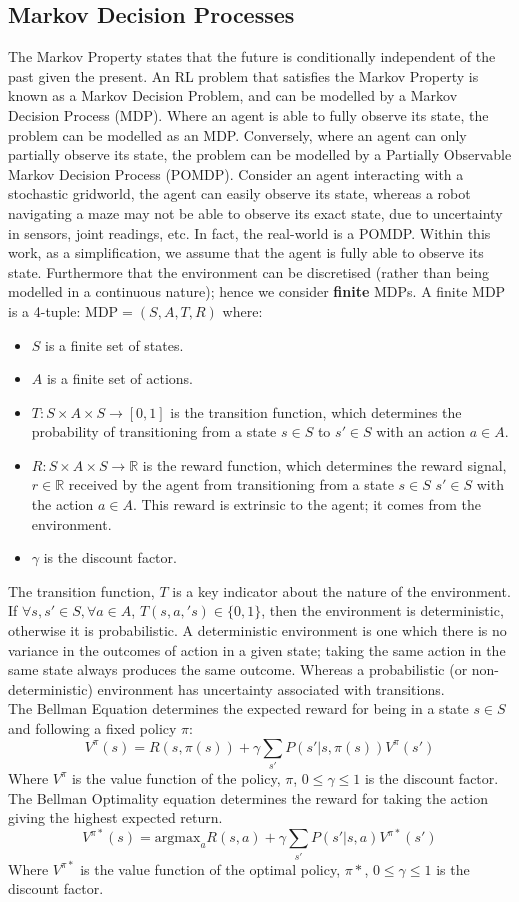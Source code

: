 \subsection{Markov Decision Processes}
The Markov Property states that the future is conditionally independent of the past given the present. An RL problem that satisfies the Markov Property is known as a Markov Decision Problem, and can be modelled by a Markov Decision Process (MDP). Where an agent is able to fully observe its state, the problem can be modelled as an MDP. Conversely, where an agent can only partially observe its state, the problem can be modelled by a Partially Observable Markov Decision Process (POMDP). Consider an agent interacting with a stochastic gridworld, the agent can easily observe its state, whereas a robot navigating a maze may not be able to observe its exact state, due to uncertainty in sensors, joint readings, etc. In fact, the real-world is a POMDP. Within this work, as a simplification, we assume that the agent is fully able to observe its state. Furthermore that the environment can be discretised (rather than being modelled in a continuous nature); hence we consider \textbf{finite} MDPs.
A finite MDP is a 4-tuple: $\text{MDP} = (S,A,T,R)$ where:
\begin{itemize}
    \item $S$ is a finite set of states.
    \item $A$ is a finite set of actions.
    \item $T : S \times A \times S \rightarrow [0,1]$ is the transition function, which determines the probability of transitioning from a state $s \in S$ to $s' \in S$ with an action $a \in A$.
    \item $R:S \times A \times S \rightarrow \mathbb{R}$ is the reward function, which determines the reward signal, $r \in \mathbb{R}$ received by the agent from transitioning from a state $s \in S$ $s' \in S$ with the action $a \in A$. This reward is extrinsic to the agent; it comes from the environment.
    \item $\gamma$ is the discount factor.
\end{itemize}
The transition function, $T$ is a key indicator about the nature of the environment.
If $\forall s,s' \in S, \forall a \in A$, $T(s,a,'s) \in \{0,1\}$, then the environment is deterministic, otherwise it is probabilistic.
A deterministic environment is one which there is no variance in the outcomes of action in a given state; taking the same action in the same state always produces the same outcome. Whereas a probabilistic (or non-deterministic) environment has uncertainty associated with transitions.
\\The Bellman Equation determines the expected reward for being in a state $s \in S$ and following a fixed policy $\pi$:
$$V^\pi(s) = R(s, \pi(s)) + \gamma \sum_{s'}P(s'|s,\pi(s))V^\pi(s')$$
Where $V^\pi$ is the value function of the policy, $\pi$, $0 \le \gamma \le 1$ is the discount factor.
The Bellman Optimality equation determines the reward for taking the action giving the highest expected return.
$$V^{\pi*}(s) = \text{argmax}_a{R(s,a) + \gamma\sum_{s'}P(s'|s,a)V^{\pi*}(s')}$$
Where $V^{\pi*}$ is the value function of the optimal policy, $\pi*$, $0 \le \gamma \le 1$ is the discount factor.
